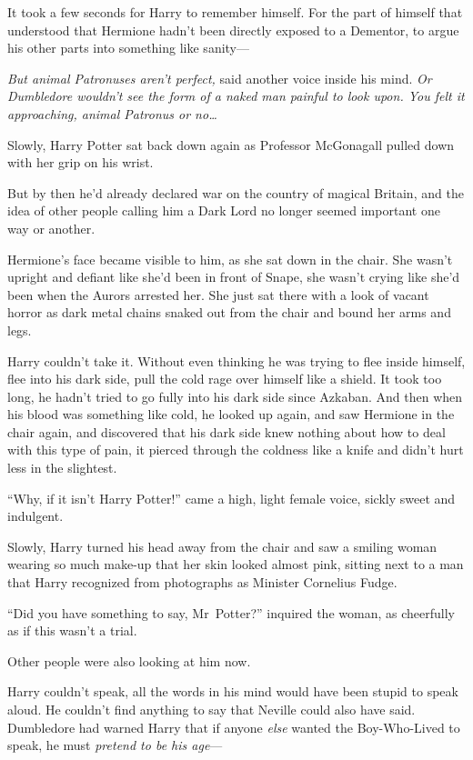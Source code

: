 It took a few seconds for Harry to remember himself. For the part of himself that understood that Hermione hadn’t been directly exposed to a Dementor, to argue his other parts into something like sanity—

\emph{But animal Patronuses aren’t perfect,} said another voice inside his mind. \emph{Or Dumbledore wouldn’t see the form of a naked man painful to look upon. You felt it approaching, animal Patronus or no…}

Slowly, Harry Potter sat back down again as Professor McGonagall pulled down with her grip on his wrist.

But by then he’d already declared war on the country of magical Britain, and the idea of other people calling him a Dark Lord no longer seemed important one way or another.

Hermione’s face became visible to him, as she sat down in the chair. She wasn’t upright and defiant like she’d been in front of Snape, she wasn’t crying like she’d been when the Aurors arrested her. She just sat there with a look of vacant horror as dark metal chains snaked out from the chair and bound her arms and legs.

Harry couldn’t take it. Without even thinking he was trying to flee inside himself, flee into his dark side, pull the cold rage over himself like a shield. It took too long, he hadn’t tried to go fully into his dark side since Azkaban. And then when his blood was something like cold, he looked up again, and saw Hermione in the chair again, and discovered that his dark side knew nothing about how to deal with this type of pain, it pierced through the coldness like a knife and didn’t hurt less in the slightest.

“Why, if it isn’t Harry Potter!” came a high, light female voice, sickly sweet and indulgent.

Slowly, Harry turned his head away from the chair and saw a smiling woman wearing so much make-up that her skin looked almost pink, sitting next to a man that Harry recognized from photographs as Minister Cornelius Fudge.

“Did you have something to say, Mr~Potter?” inquired the woman, as cheerfully as if this wasn’t a trial.

Other people were also looking at him now.

Harry couldn’t speak, all the words in his mind would have been stupid to speak aloud. He couldn’t find anything to say that Neville could also have said. Dumbledore had warned Harry that if anyone \emph{else} wanted the Boy-Who-Lived to speak, he must \emph{pretend to be his age}—

